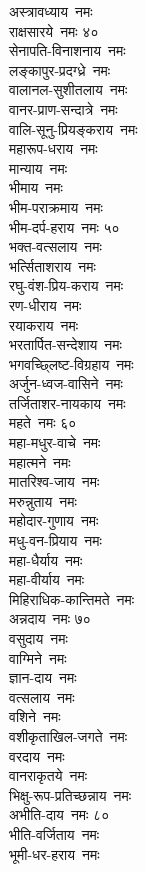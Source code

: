\begin{multicols}{2}
\begin{flushleft}
अस्त्रावध्याय~नमः\\
राक्षसारये~नमः \hfill ४०\\
सेनापति-विनाशनाय~नमः\\
लङ्कापुर-प्रदग्ध्रे~नमः\\
वालानल-सुशीतलाय~नमः\\
वानर-प्राण-सन्दात्रे~नमः\\
वालि-सूनु-प्रियङ्कराय~नमः\\
महारूप-धराय~नमः\\
मान्याय~नमः\\
भीमाय~नमः\\
भीम-पराक्रमाय~नमः\\
भीम-दर्प-हराय~नमः \hfill ५०\\
भक्त-वत्सलाय~नमः\\
भर्त्सिताशराय~नमः\\
रघु-वंश-प्रिय-कराय~नमः\\
रण-धीराय~नमः\\
रयाकराय~नमः\\
भरतार्पित-सन्देशाय~नमः\\
भगवच्छ्लिष्ट-विग्रहाय~नमः\\
अर्जुन-ध्वज-वासिने~नमः\\
तर्जिताशर-नायकाय~नमः\\
महते~नमः \hfill ६०\\
महा-मधुर-वाचे~नमः\\
महात्मने~नमः\\
मातरिश्व-जाय~नमः\\
मरुन्नुताय~नमः\\
महोदार-गुणाय~नमः\\
मधु-वन-प्रियाय~नमः\\
महा-धैर्याय~नमः\\
महा-वीर्याय~नमः\\
मिहिराधिक-कान्तिमते~नमः\\
अन्नदाय~नमः \hfill ७०\\
वसुदाय~नमः \\
वाग्मिने~नमः\\
ज्ञान-दाय~नमः\\
वत्सलाय~नमः\\
वशिने~नमः\\
वशीकृताखिल-जगते~नमः\\
वरदाय~नमः\\
वानराकृतये~नमः\\
भिक्षु-रूप-प्रतिच्छन्नाय~नमः\\
अभीति-दाय~नमः \hfill ८०\\
भीति-वर्जिताय~नमः \\
भूमी-धर-हराय~नमः\\

\end{flushleft}
\end{multicols}
